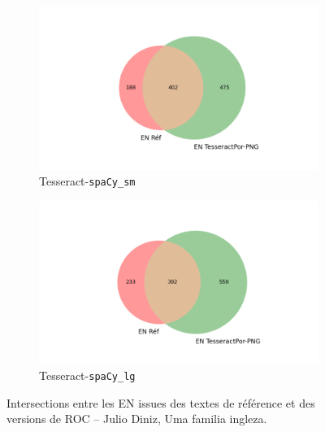 \begin{figure}
\begin{minipage}{7cm}
\begin{subfigure}{0.99\textwidth}
  \label{fig:}
  \end{subfigure}
  \end{minipage}
  \begin{minipage}{7cm}
  \begin{subfigure}{0.99\textwidth}
  \includegraphics[width=.99\textwidth]{IMAGES/ELTeC_INTERSECTIONS_spaCy3.5.1/DINIZ_Familia-Inglezia_TesseractPor-PNG.txt_spacy-sm-concat.json_intersection.png} 
  \caption{Tesseract-\texttt{spaCy\_sm}}
  \label{fig:}
  \end{subfigure}
    \end{minipage}
  \begin{minipage}{7cm}
  \begin{subfigure}{0.99\textwidth}
  \includegraphics[width=.99\textwidth]{IMAGES/ELTeC_INTERSECTIONS_spaCy3.5.1/DINIZ_Familia-Inglezia_TesseractPor-PNG.txt_spacy-lg-concat.json_intersection.png}
   \caption{Tesseract-\texttt{spaCy\_lg}}
  \label{fig: }
  \end{subfigure}
  \end{minipage}
\caption{Intersections entre les EN issues des textes de référence et des versions de ROC -- Julio Diniz, {\normalfont Uma familia ingleza}.}
\label{fig:DINIZ_INTERSECTION}
\end{figure}

